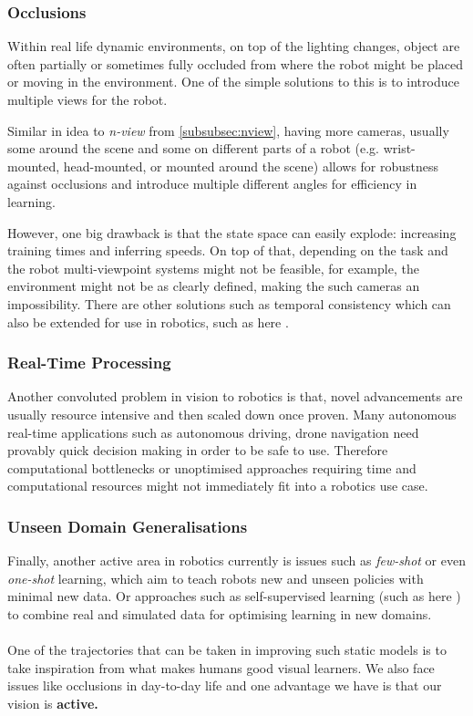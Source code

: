     \subsubsection{Occlusions}
      Within real life dynamic environments, on top of the lighting changes, object are often partially or sometimes fully occluded from where the robot might be placed or moving in the environment.  One of the simple solutions to this is to introduce multiple views for the robot. 
      
      Similar in idea to \emph{n-view} from \ref{subsubsec:nview}, having more cameras, usually some around the scene and some on different parts of a robot (e.g. wrist-mounted, head-mounted, or mounted around the scene) allows for robustness against occlusions and introduce multiple different angles for efficiency in learning. 

      However, one big drawback is that the state space can easily explode: increasing training times and inferring speeds. On top of that, depending on the task and the robot multi-viewpoint systems might not be feasible, for example, the environment might not be as clearly defined, making the such cameras an impossibility. There are other solutions such as temporal consistency \cite{lai2018learningblindvideotemporal} which can also be extended for use in robotics, such as here \cite{billington2007using, yang2021reactive}.

    \subsubsection{Real-Time Processing}
    Another convoluted problem in vision to robotics is that, novel advancements are usually resource intensive and then scaled down once proven. Many autonomous real-time  applications such as autonomous driving, drone navigation need provably quick decision making in order to be safe to use. Therefore computational bottlenecks or unoptimised approaches requiring time and computational resources might not immediately fit into a robotics use case.

    \subsubsection{Unseen Domain Generalisations}
    Finally, another active area in robotics currently is issues such as \emph{few-shot} or even \emph{one-shot} learning, which aim to teach robots new and unseen policies with minimal new data. Or approaches such as self-supervised learning (such as here \cite{lim2022real2sim2real, huang2021robot}) to combine real and simulated data for optimising learning in new domains.
    \\\\
    One of the trajectories that can be taken in improving such static models is to take inspiration from what makes humans good visual learners. We also face issues like occlusions in day-to-day life and one advantage we have is that our vision is \textbf{active.}
    
  

    